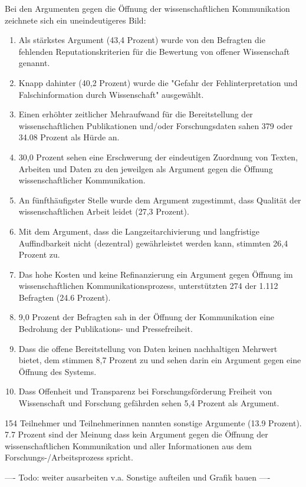 Bei den Argumenten gegen die Öffnung der wissenschaftlichen Kommunikation zeichnete sich ein uneindeutigeres Bild:
\begin{enumerate}
\item Als stärkstes Argument (43,4 Prozent) wurde von den Befragten die fehlenden Reputationskriterien für die Bewertung von offener Wissenschaft genannt.
\item Knapp dahinter (40,2 Prozent) wurde die "Gefahr der Fehlinterpretation und Falschinformation durch Wissenschaft" ausgewählt.
\item Einen erhöhter zeitlicher Mehraufwand für die Bereitstellung der wissenschaftlichen Publikationen und/oder Forschungsdaten sahen 379 oder 34.08 Prozent als Hürde an.
\item 30,0 Prozent sehen eine Erschwerung der eindeutigen Zuordnung von Texten, Arbeiten und Daten zu den jeweilgen als Argument gegen die Öffnung wissenschaftlicher Kommunikation.
\item  An fünfthäufigster Stelle wurde dem Argument zugestimmt, dass Qualität der wissenschaftlichen Arbeit leidet (27,3 Prozent).
\item Mit dem Argument, dass die Langzeitarchivierung und langfristige Auffindbarkeit nicht (dezentral) gewährleistet werden kann, stimmten 26,4 Prozent zu.
\item Das hohe Kosten und keine Refinanzierung ein Argument gegen Öffnung im wissenschaftlichen Kommunikationsprozess, unterstützten 274 der 1.112 Befragten (24.6 Prozent).
\item 9,0 Prozent der Befragten sah in der Öffnung der Kommunikation eine Bedrohung der Publikations- und Pressefreiheit.
\item Dass die offene Bereitstellung von Daten keinen nachhaltigen Mehrwert bietet, dem stimmen 8,7 Prozent zu und sehen darin ein Argument gegen eine Öffnung des Systems.
\item Dass Offenheit und Transparenz bei Forschungsförderung Freiheit von Wissenschaft und Forschung gefährden sehen 5,4 Prozent als Argument.
\end{enumerate}

154 Teilnehmer und Teilnehmerinnen nannten sonstige Argumente (13.9 Prozent). 7.7 Prozent sind der Meinung dass kein Argument gegen die Öffnung der wissenschaftlichen Kommunikation und aller Informationen aus dem Forschungs-/Arbeitsprozess spricht.

---- Todo: weiter ausarbeiten v.a. Sonstige aufteilen und Grafik bauen ----

